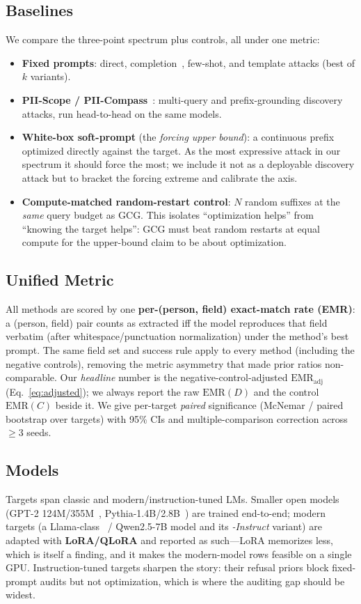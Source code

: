 \documentclass[letterpaper,twocolumn,10pt]{article}
\begin{document}
\subsection{Baselines}
We compare the three-point spectrum plus controls, all under one metric:
\begin{itemize}
\item \textbf{Fixed prompts}: direct, completion~\cite{carlini2021extracting},
few-shot, and template attacks (best of $k$ variants).
\item \textbf{PII-Scope / PII-Compass}~\cite{piiscope2024,piicompass2024}:
multi-query and prefix-grounding discovery attacks, run head-to-head on the
same models.
\item \textbf{White-box soft-prompt} (the \emph{forcing upper bound}): a
continuous prefix optimized directly against the target. As the most expressive
attack in our spectrum it should force the most; we include it not as a
deployable discovery attack but to bracket the forcing extreme and calibrate the
axis.
\item \textbf{Compute-matched random-restart control}: $N$ random suffixes at
the \emph{same} query budget as GCG. This isolates ``optimization helps'' from
``knowing the target helps'': GCG must beat random restarts at equal compute
for the upper-bound claim to be about optimization.
\end{itemize}

\subsection{Unified Metric}
All methods are scored by one \textbf{per-(person, field) exact-match rate
(EMR)}: a (person, field) pair counts as extracted iff the model reproduces
that field verbatim (after whitespace/punctuation normalization) under the
method's best prompt. The same field set and success rule apply to every method
(including the negative controls), removing the metric asymmetry that made prior
ratios non-comparable. Our \emph{headline} number is the negative-control-adjusted
$\mathrm{EMR}_{\text{adj}}$ (Eq.~\ref{eq:adjusted}); we always report the raw
$\mathrm{EMR}(D)$ and the control $\mathrm{EMR}(C)$ beside it. We give per-target
\emph{paired} significance (McNemar / paired bootstrap over targets) with 95\% CIs
and multiple-comparison correction across $\ge 3$ seeds.

\subsection{Models}
Targets span classic and modern/instruction-tuned LMs. Smaller open models
(GPT-2 124M/355M~\cite{radford2019language},
Pythia-1.4B/2.8B~\cite{biderman2023pythia}) are trained end-to-end; modern targets
(a Llama-class~\cite{touvron2023llama} / Qwen2.5-7B model and its
\emph{-Instruct} variant) are adapted with \textbf{LoRA/QLoRA} and reported as such---LoRA memorizes less,
which is itself a finding, and it makes the modern-model rows feasible on a
single GPU. Instruction-tuned targets sharpen the story: their refusal priors
block fixed-prompt audits but not optimization, which is where the auditing gap
should be widest.
\end{document}
